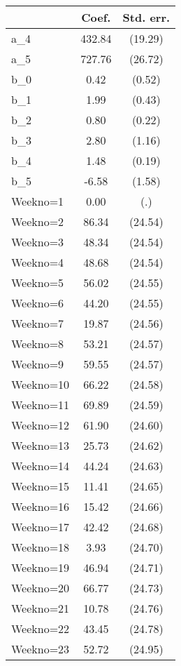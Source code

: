 {
\def\sym#1{\ifmmode^{#1}\else\(^{#1}\)\fi}
\begin{tabular}{l*{1}{cc}}
\hline\hline
                &    Coef.&Std. err.\\
\hline
a\_4             &   432.84&  (19.29)\\
a\_5             &   727.76&  (26.72)\\
b\_0             &     0.42&   (0.52)\\
b\_1             &     1.99&   (0.43)\\
b\_2             &     0.80&   (0.22)\\
b\_3             &     2.80&   (1.16)\\
b\_4             &     1.48&   (0.19)\\
b\_5             &    -6.58&   (1.58)\\
Weekno=1        &     0.00&      (.)\\
Weekno=2        &    86.34&  (24.54)\\
Weekno=3        &    48.34&  (24.54)\\
Weekno=4        &    48.68&  (24.54)\\
Weekno=5        &    56.02&  (24.55)\\
Weekno=6        &    44.20&  (24.55)\\
Weekno=7        &    19.87&  (24.56)\\
Weekno=8        &    53.21&  (24.57)\\
Weekno=9        &    59.55&  (24.57)\\
Weekno=10       &    66.22&  (24.58)\\
Weekno=11       &    69.89&  (24.59)\\
Weekno=12       &    61.90&  (24.60)\\
Weekno=13       &    25.73&  (24.62)\\
Weekno=14       &    44.24&  (24.63)\\
Weekno=15       &    11.41&  (24.65)\\
Weekno=16       &    15.42&  (24.66)\\
Weekno=17       &    42.42&  (24.68)\\
Weekno=18       &     3.93&  (24.70)\\
Weekno=19       &    46.94&  (24.71)\\
Weekno=20       &    66.77&  (24.73)\\
Weekno=21       &    10.78&  (24.76)\\
Weekno=22       &    43.45&  (24.78)\\
Weekno=23       &    52.72&  (24.95)\\

\end{tabular}}
